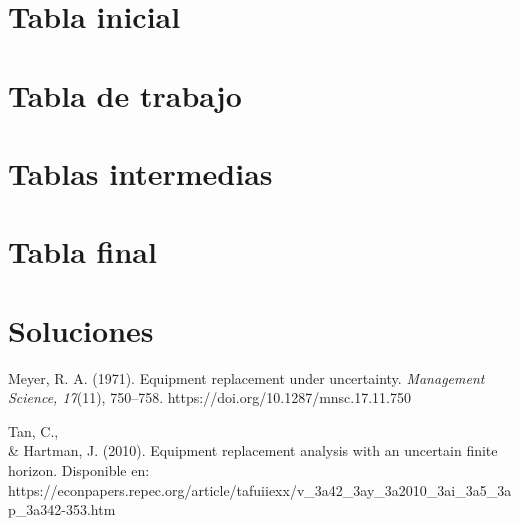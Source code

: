 \documentclass[12pt]{article}
\begin{document}
\bigskip
\section*{Tabla inicial}
\section*{Tabla de trabajo}
\section*{Tablas intermedias}
\newpage
\section*{Tabla final}
\section*{Soluciones}
\begin{thebibliography}{9}
 Meyer, R. A. (1971). Equipment replacement under uncertainty. \textit{Management Science, 17}(11), 750--758. https://doi.org/10.1287/mnsc.17.11.750

 Tan, C., \\& Hartman, J. (2010). Equipment replacement analysis with an uncertain finite horizon. Disponible en: https://econpapers.repec.org/article/tafuiiexx/v\_3a42\_3ay\_3a2010\_3ai\_3a5\_3ap\_3a342-353.htm

\end{thebibliography}
\end{document}
